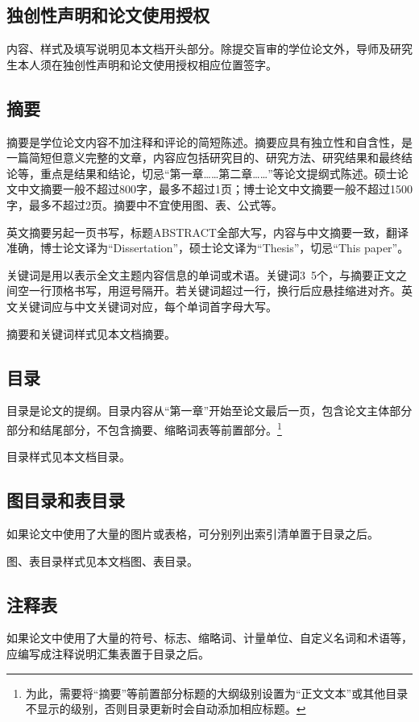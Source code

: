 \subsection{独创性声明和论文使用授权}
内容、样式及填写说明见本文档开头部分。除提交盲审的学位论文外，导师及研究生本人须在独创性声明和论文使用授权相应位置签字。

\subsection{摘要}
摘要是学位论文内容不加注释和评论的简短陈述。摘要应具有独立性和自含性，是一篇简短但意义完整的文章，内容应包括研究目的、研究方法、研究结果和最终结论等，重点是结果和结论，切忌“第一章……第二章……”等论文提纲式陈述。硕士论文中文摘要一般不超过800字，最多不超过1页；博士论文中文摘要一般不超过1500字，最多不超过2页。摘要中不宜使用图、表、公式等。

英文摘要另起一页书写，标题ABSTRACT全部大写，内容与中文摘要一致，翻译准确，博士论文译为“Dissertation”，硕士论文译为“Thesis”，切忌“This paper”。

关键词是用以表示全文主题内容信息的单词或术语。关键词3~5个，与摘要正文之间空一行顶格书写，用逗号隔开。若关键词超过一行，换行后应悬挂缩进对齐。英文关键词应与中文关键词对应，每个单词首字母大写。

摘要和关键词样式见本文档摘要。

\subsection{目录}
目录是论文的提纲。目录内容从“第一章”开始至论文最后一页，包含论文主体部分部分和结尾部分，不包含摘要、缩略词表等前置部分。\footnote{为此，需要将“摘要”等前置部分标题的大纲级别设置为“正文文本”或其他目录不显示的级别，否则目录更新时会自动添加相应标题。}

目录样式见本文档目录。

\subsection{图目录和表目录}
如果论文中使用了大量的图片或表格，可分别列出索引清单置于目录之后。

图、表目录样式见本文档图、表目录。

\subsection{注释表}
如果论文中使用了大量的符号、标志、缩略词、计量单位、自定义名词和术语等，应编写成注释说明汇集表置于目录之后。

